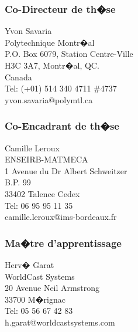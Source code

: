 \subsubsection{Co-Directeur de th�se}
Yvon Savaria\\
Polytechnique Montr�al\\
P.O. Box 6079, Station Centre-Ville\\
H3C 3A7, Montr�al, QC.\\
Canada\\
Tel: (+01) 514 340 4711 \#4737\\
yvon.savaria@polymtl.ca\\
\subsubsection{Co-Encadrant de th�se}
Camille Leroux\\
ENSEIRB-MATMECA\\
1 Avenue du Dr Albert Schweitzer\\
B.P. 99\\
33402 Talence Cedex\\
Tel: 06 95 95 11 35\\
camille.leroux@ims-bordeaux.fr\\
\subsubsection{Ma�tre d'apprentissage}
Herv� Garat\\
WorldCast Systems\\
20 Avenue Neil Armstrong\\
33700 M�rignac\\
Tel: 05 56 67 42 83\\
h.garat@worldcastsystems.com\\




